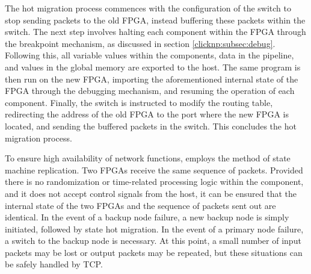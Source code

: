 The hot migration process commences with the configuration of the switch to stop sending packets to the old FPGA, instead buffering these packets within the switch. The next step involves halting each component within the FPGA through the breakpoint mechanism, as discussed in section \ref{clicknp:subsec:debug}. Following this, all variable values within the components, data in the pipeline, and values in the global memory are exported to the host. The same \name program is then run on the new FPGA, importing the aforementioned internal state of the FPGA through the debugging mechanism, and resuming the operation of each component. Finally, the switch is instructed to modify the routing table, redirecting the address of the old FPGA to the port where the new FPGA is located, and sending the buffered packets in the switch. This concludes the hot migration process.

To ensure high availability of network functions, \name employs the method of state machine replication. Two FPGAs receive the same sequence of packets. Provided there is no randomization or time-related processing logic within the component, and it does not accept control signals from the host, it can be ensured that the internal state of the two FPGAs and the sequence of packets sent out are identical. In the event of a backup node failure, a new backup node is simply initiated, followed by state hot migration. In the event of a primary node failure, a switch to the backup node is necessary. At this point, a small number of input packets may be lost or output packets may be repeated, but these situations can be safely handled by TCP.

